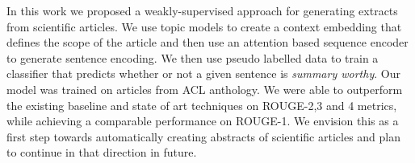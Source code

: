 In this work we proposed a weakly-supervised approach for generating extracts from scientific articles. We use topic models to create a context embedding that defines the scope of the article and then use an attention based sequence encoder to generate sentence encoding. We then use pseudo labelled data to train a classifier that predicts whether or not a given sentence is \emph{summary worthy}. Our model was trained on articles from ACL anthology. We were able to outperform the existing baseline and state of art techniques on ROUGE-2,3 and 4 metrics, while achieving a comparable performance on ROUGE-1. We envision this as a first step towards automatically creating abstracts of scientific articles and plan to continue in that direction in future.

